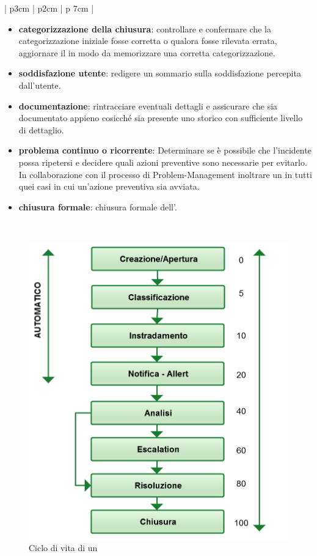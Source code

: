 \begin{center}
\begin{longtable}{| p{3cm} | p{2cm} | p {7cm} |}
\begin{itemize}
\item{\textbf{categorizzazione della chiusura}: controllare e confermare che la categorizzazione iniziale fosse corretta o qualora fosse rilevata errata, aggiornare il  in modo da memorizzare una corretta categorizzazione.}
\item{\textbf{soddisfazione utente}: redigere un sommario sulla soddisfazione percepita dall'utente.}
\item{\textbf{documentazione}: rintracciare eventuali dettagli e assicurare che  sia documentato appieno cosicché sia presente uno storico con sufficiente livello di dettaglio.}
\item{\textbf{problema continuo o ricorrente}: Determinare se è possibile che l'incidente possa ripetersi e decidere quali azioni preventive sono necessarie per evitarlo. In collaborazione con il processo di \ac{Problem-Management} inoltrare un  in tutti quei casi in cui un'azione preventiva sia avviata.}
\item{\textbf{chiusura formale}: chiusura formale dell'.}
\end{itemize}\\
\hline
\end{longtable}
\end{center}

\begin{figure}[htbp]
\centering
\includegraphics[scale=0.25]{Images/Diagrams/Ticket_life_cycle.png}
\caption{Ciclo di vita di un }
\label{im-flow-life-cycle-img}
\end{figure}